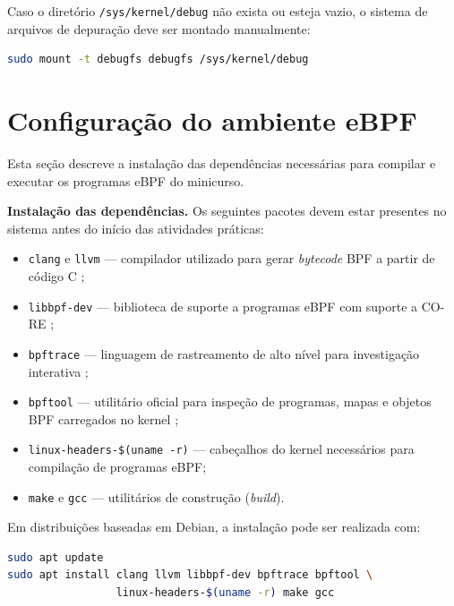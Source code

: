 Caso o diretório \texttt{/sys/kernel/debug} não exista ou esteja vazio, o sistema
de arquivos de depuração deve ser montado manualmente:

\begin{lstlisting}[language=bash,
  caption={Montagem do sistema de arquivos de depuração.}]
sudo mount -t debugfs debugfs /sys/kernel/debug
\end{lstlisting}

\section{Configuração do ambiente eBPF}

Esta seção descreve a instalação das dependências necessárias para compilar e
executar os programas eBPF do minicurso.

\textbf{Instalação das dependências.}
Os seguintes pacotes devem estar presentes no sistema antes do início das
atividades práticas:

\begin{itemize}
  \item \texttt{clang} e \texttt{llvm} --- compilador utilizado para gerar
        \textit{bytecode} BPF a partir de código C \cite{linuxkernel2024};
  \item \texttt{libbpf-dev} --- biblioteca de suporte a programas eBPF com
        suporte a CO-RE \cite{libbpf};
  \item \texttt{bpftrace} --- linguagem de rastreamento de alto nível para
        investigação interativa \cite{bpftrace};
  \item \texttt{bpftool} --- utilitário oficial para inspeção de programas,
        mapas e objetos BPF carregados no kernel \cite{linuxkernel2024};
  \item \texttt{linux-headers-\$(uname -r)} --- cabeçalhos do kernel necessários
        para compilação de programas eBPF;
  \item \texttt{make} e \texttt{gcc} --- utilitários de construção (\textit{build}).
\end{itemize}

Em distribuições baseadas em Debian, a instalação pode ser realizada com:

\begin{lstlisting}[language=bash,
  caption={Instalação das dependências em Ubuntu 22.04 / Debian 12.}]
sudo apt update
sudo apt install clang llvm libbpf-dev bpftrace bpftool \
                 linux-headers-$(uname -r) make gcc
\end{lstlisting}

